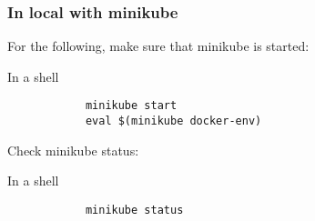\begin{frame}[fragile]
	\frametitle{In local with minikube}
	
	For the following, make sure that minikube is started:
	\begin{block}{In a shell}
		\begin{verbatim}
			minikube start
			eval $(minikube docker-env)
		\end{verbatim}
	\end{block}
	
	Check minikube status:
	\begin{block}{In a shell}
		\begin{verbatim}
			minikube status
		\end{verbatim}
	\end{block}
\end{frame}